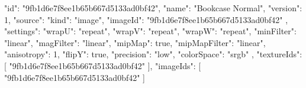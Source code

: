 {
  "id": "9fb1d6e7f8ee1b65b667d5133ad0bf42",
  "name": "Bookcase Normal",
  "version": 1,
  "source": {
    "kind": "image",
    "imageId": "9fb1d6e7f8ee1b65b667d5133ad0bf42"
  },
  "settings": {
    "wrapU": "repeat",
    "wrapV": "repeat",
    "wrapW": "repeat",
    "minFilter": "linear",
    "magFilter": "linear",
    "mipMap": true,
    "mipMapFilter": "linear",
    "anisotropy": 1,
    "flipY": true,
    "precision": "low",
    "colorSpace": "srgb"
  },
  "textureIds": [
    "9fb1d6e7f8ee1b65b667d5133ad0bf42"
  ],
  "imageIds": [
    "9fb1d6e7f8ee1b65b667d5133ad0bf42"
  ]
}
